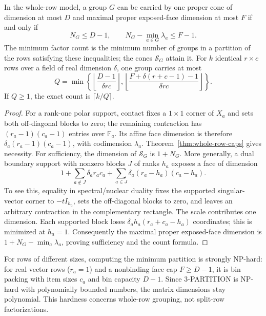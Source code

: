 \begin{corollary}\label{cor:spectral-caps}
In the whole-row model, a group $G$ can be carried by one proper
cone of dimension at most $D$ and maximal proper exposed-face dimension
at most $F$ if and only if
\begin{equation}\label{eq:spectral-group-caps}
 N_G\leq D-1,\qquad N_G-\min_{a\in G}\lambda_a\leq F-1.
\end{equation}
The minimum factor count is the minimum number of groups in a partition
of the rows satisfying these inequalities; the cones $\mathcal S_G$ attain it.
For $k$ identical $r\times c$ rows over a field of real dimension $\delta$,
one group carries at most
\[
 Q=\min\left\{
    \left\lfloor\frac{D-1}{\delta rc}\right\rfloor,
    \left\lfloor\frac{F+\delta(r+c-1)-1}{\delta rc}\right\rfloor
    \right\}.
\]
If $Q\geq1$, the exact count is $\lceil k/Q\rceil$.
\end{corollary}
\begin{proof}
For a rank-one polar support, contact fixes a $1\times1$ corner of
$X_a$ and sets both off-diagonal blocks to zero; the remaining contraction has
$(r_a-1)(c_a-1)$ entries over $\mathbb F_a$.  Its affine face dimension
is therefore $\delta_a(r_a-1)(c_a-1)$, with codimension $\lambda_a$.
Theorem~\ref{thm:whole-row-caps} gives necessity.
For sufficiency, the dimension of $\mathcal S_G$ is $1+N_G$.
More generally, a dual boundary support with nonzero blocks $J$ of
ranks $h_a$ exposes a face of dimension
\[
 1+\sum_{a\notin J}\delta_a r_ac_a
   +\sum_{a\in J}\delta_a(r_a-h_a)(c_a-h_a).
\]
To see this, equality in spectral/nuclear duality fixes the supported
singular-vector corner to $-tI_{h_a}$, sets the off-diagonal
blocks to zero, and leaves an arbitrary contraction in the complementary rectangle.
The scale contributes one dimension.  Each supported block loses
$\delta_a h_a(r_a+c_a-h_a)$ coordinates; this is minimized at $h_a=1$.
Consequently the maximal proper exposed-face dimension is
$1+N_G-\min_a\lambda_a$, proving sufficiency and the count formula.
\end{proof}

For rows of different sizes, computing the minimum partition is
strongly NP-hard: for real vector rows ($r_a=1$) and a nonbinding face
cap $F\geq D-1$, it is bin packing with item sizes $c_a$ and bin
capacity $D-1$.  Since $3$-PARTITION is NP-hard with polynomially
bounded numbers, the matrix dimensions stay polynomial.  This hardness
concerns whole-row grouping, not split-row factorizations.

